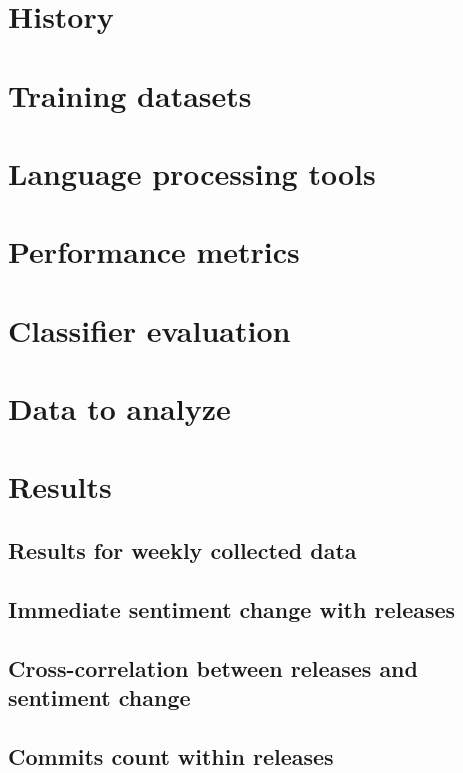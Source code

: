 \section{History}


\section{Training datasets} \label{sec:trainingDatasets}


\section{Language processing tools} \label{sec:languageProcessingTools}


\section{Performance metrics}


\section{Classifier evaluation}
\label{sec:classifierEvaluation}


\section{Data to analyze}


\section{Results}

\subsection{Results for weekly collected data}
\label{ssec:weekly}


\subsection{Immediate sentiment change with releases}
\label{ssec:beforeAfter}


\subsection{Cross-correlation between releases and sentiment change} 
\label{ssec:crossCorrelation}


\subsection{Commits count within releases} \label{ssec:crossCorrelationCommits}
 
